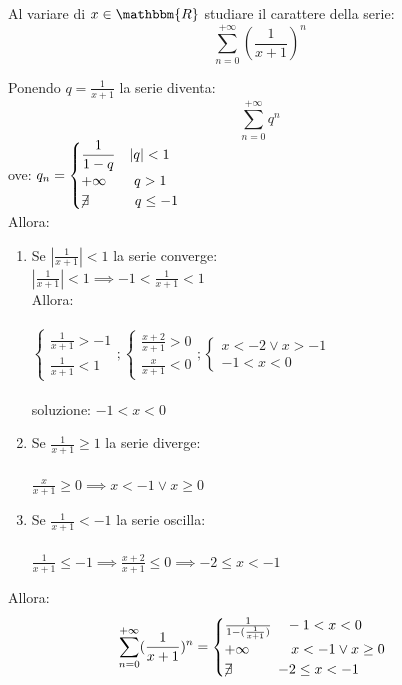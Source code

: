 \documentclass[12pt]{report}
\newcounter{exercise}
\begin{document}
 		\begin{assignment}
 			Al variare di $x \in \mathbbm{R}$ studiare il carattere della serie:
 			\[
 			\sum_{n=0}^{+\infty}(\frac{1}{x+1})^n
 			\]
 			\begin{exercise}{}{}
 				Ponendo $q = \frac{1}{x+1}$ la serie diventa:
 				\[
 				\sum_{n=0}^{+\infty}q^n
 				\]
 				ove: $q_n = \begin{cases}
 					\dfrac{1}{1 - q}\quad |q| < 1 \\
 					+\infty \quad\quad q > 1 \\
 					\centernot{\exists}\quad\quad\quad q \leq -1
 					\end{cases}$ \\
 				Allora:
 				\begin{enumerate}
 					\item Se $|\frac{1}{x+1}| < 1$ la serie converge: \\
 					$|\frac{1}{x+1}| < 1 \implies - 1< \frac{1}{x+1} < 1$\\
 					Allora: \\ \\
 					$\begin{cases}
 						\frac{1}{x+1} > -1 \\
 						\frac{1}{x+1} < 1
 					\end{cases} ; \begin{cases}
 					\frac{x + 2}{x+1} >0 \\
 					\frac{x}{x+1} < 0
 					\end{cases} ; \begin{cases}
 					x < -2 \vee x > -1 \\
 					-1 < x < 0
 					\end{cases}$ \\ \\
 					soluzione: $-1 < x < 0$
 					\item Se $\frac{1}{x+1} \geq 1$ la serie diverge: \\ \\
 					$\frac{x}{x+1} \geq 0 \implies x < -1 \vee x \geq 0$
 					\item Se $\frac{1}{x+1} < -1$ la serie oscilla: \\ \\
 					$\frac{1}{x+1} \leq - 1\implies \frac{x+2}{x+1} \leq 0 \implies -2 \leq x < -1$
				\end{enumerate}
				 Allora:
				\[
				\sum_{n=0}^{+\infty}(\frac{1}{x+1})^n=\begin{cases}
					\frac{1}{1-(\frac{1}{x+1})} \quad - 1 < x < 0 \\
					+\infty \quad\quad\quad  x < -1 \vee x \geq 0 \\
					\centernot{\exists} \quad\quad\quad  -2 \leq x < -1
				\end{cases}
				\]
 			\end{exercise}
 		\end{assignment}
\end{document}
